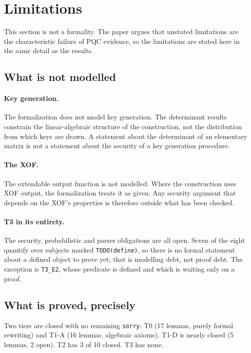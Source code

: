 \section{Limitations}
\label{sec:limitations}

This section is not a formality. The paper argues that unstated limitations are
the characteristic failure of PQC evidence, so the limitations are stated here
in the same detail as the results.

\subsection{What is not modelled}

\paragraph{Key generation.} The formalization does not model key generation. The
determinant results constrain the linear-algebraic structure of the construction,
not the distribution from which keys are drawn. A statement about the
determinant of an elementary matrix is not a statement about the security of a
key generation procedure.

\paragraph{The XOF.} The extendable output function is not modelled. Where the
construction uses XOF output, the formalization treats it as given. Any security
argument that depends on the XOF's properties is therefore outside what has been
checked.

\paragraph{T3 in its entirety.} The security, probabilistic and parser
obligations are all open. Seven of the eight quantify over subjects marked
\texttt{TODO(define)}, so there is no formal statement about a defined object to
prove yet; that is modelling debt, not proof debt. The exception is
\texttt{T3\_E2}, whose predicate is defined and which is waiting only on a proof.

\subsection{What is proved, precisely}

Two tiers are closed with no remaining \texttt{sorry}: T0 (17 lemmas, purely
formal rewriting) and T1-A (16 lemmas, algebraic axioms). T1-D is nearly closed
(5 lemmas, 2 open). T2 has 3 of 10 closed. T3 has none.


